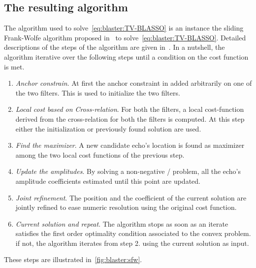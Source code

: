 \subsection{The resulting algorithm}
The algorithm used to solve~\cref{eq:blaster:TV-BLASSO} is an instance the sliding Frank-Wolfe algorithm proposed in~ to solve~\cref{eq:blaster:TV-BLASSO}.
Detailed descriptions of the steps of the algorithm are given in~.
In a nutshell, the algorithm iterative over the following steps until a condition on the cost function is met.
\begin{enumerate}
    \item \textit{Anchor constrain}.
    At first the anchor constraint in added arbitrarily on one of the two filters. This is used to initialize the two filters.
    \item \textit{\textit{Local} cost based on Cross-relation}.
    For both the filters, a local cost-function derived from the cross-relation for both the filters is computed.
    At this step either the initialization or previously found solution are used.
    \item \textit{Find the maximizer}.
    A new candidate echo's location is found as maximizer among the two local cost functions of the previous step.
    \item \textit{Update the amplitudes}.
    By solving a non-negative \LASSO/ problem, all the echo's amplitude coefficients estimated until this point are updated.
    \item \textit{Joint refinement}.
    The position and the coefficient of the current solution are jointly refined to ease numeric resolution using the original cost function.
    \item \textit{Current solution and repeat}.
    The algorithm stops as soon as an iterate satisfies the first order optimality condition associated to the convex problem.
    if not, the algorithm iterates from step 2. using the current solution as input.
\end{enumerate}
These steps are illustrated in~\cref{fig:blaster:sfw}.

